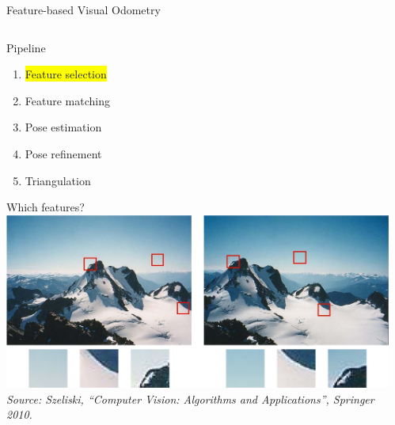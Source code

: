 \documentclass[10pt]{beamer}
\begin{document}
\begin{frame}{Feature-based Visual Odometry}
	\begin{columns}
	  \begin{column}{0.4\textwidth}
	  	\begin{block}{Pipeline}
		  	\begin{enumerate}
				\item \colorbox{yellow}{Feature selection}
				\item Feature matching 
				\item Pose estimation
				\item Pose refinement
				\item Triangulation
			\end{enumerate}
		\end{block}
		\begin{block}{Which features?}
			\vspace{0.3cm}
			\includegraphics[width=\textwidth]{img/feature_selection.png}
			\vspace{0.1cm}
  			\tiny{\emph{Source: Szeliski, ``Computer Vision: Algorithms and Applications'', Springer 2010.}}
		\end{block}
	  \end{column}
	  \begin{column}{0.6\textwidth}

\end{column}
\end{columns}
\end{frame}
\end{document}
